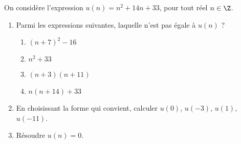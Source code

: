 
On considère l'expression $u(n)= n^2+14n+33$, pour tout réel $n \in \Z$.

\begin{enumerate}
\item Parmi les expressions suivantes, laquelle n'est pas égale à $u(n)$ ?

\begin{enumerate}
\item $(n+7)^2-16$
\item $n^2+33$
\item $(n+3)(n+11)$
\item $n(n+14)+33$
\end{enumerate}
\item En choisissant la forme qui convient, calculer $u(0)$, $u(-3)$, $u(1)$, $u(-11)$.
\item Résoudre $u(n)=0$.
\end{enumerate}


